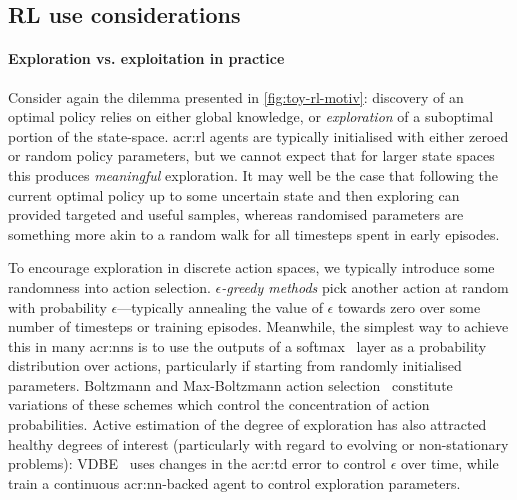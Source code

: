 %
%
%

\subsection{RL use considerations}\label{sec:ddn-rl-design-considerations}
\paragraph{Exploration vs. exploitation in practice}
Consider again the dilemma presented in \cref{fig:toy-rl-motiv}: discovery of an optimal policy relies on either global knowledge, or \emph{exploration} of a suboptimal portion of the state-space.
\gls{acr:rl} agents are typically initialised with either zeroed or random policy parameters, but we cannot expect that for larger state spaces this produces \emph{meaningful} exploration.
It may well be the case that following the current optimal policy up to some uncertain state and then exploring can provided targeted and useful samples, whereas randomised parameters are something more akin to a random walk for all timesteps spent in early episodes.

To encourage exploration in discrete action spaces, we typically introduce some randomness into action selection.
\emph{$\epsilon$-greedy methods} pick another action at random with probability $\epsilon$---typically annealing the value of $\epsilon$ towards zero over some number of timesteps or training episodes.
Meanwhile, the simplest way to achieve this in many \glspl{acr:nn} is to use the outputs of a softmax~\parencite{luce-softmax} layer as a probability distribution over actions, particularly if starting from randomly initialised parameters.
Boltzmann and Max-Boltzmann action selection~\parencite[p. 73]{WieringMThesisRLExploration} constitute variations of these schemes which control the concentration of action probabilities.
Active estimation of the degree of exploration has also attracted healthy degrees of interest (particularly with regard to evolving or non-stationary problems): VDBE~\parencite{DBLP:conf/ki/Tokic10,DBLP:conf/ki/TokicP11} uses changes in the \gls{acr:td} error to control $\epsilon$ over time, while \textcite{DBLP:conf/annpr/TokicP12} train a continuous \gls{acr:nn}-backed agent to control exploration parameters.

